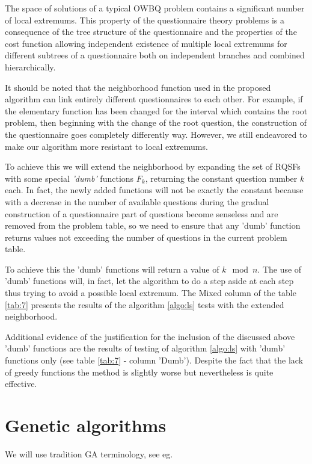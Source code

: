 \documentclass[11pt]{article}
\begin{document}
The space of solutions of a typical OWBQ problem contains a significant number of local extremums. This property of the questionnaire theory problems is a consequence of the tree structure of the questionnaire and the properties of the cost function allowing independent existence of multiple local extremums for different subtrees of a questionnaire both on independent branches and combined hierarchically.

It should be noted that the neighborhood function used in the proposed algorithm can link entirely different questionnaires to each other. For example, if the elementary function has been changed for the interval which contains the root problem, then beginning with the change of the root question, the construction of the questionnaire goes completely differently way. However, we still endeavored to make our algorithm more resistant to local extremums.

To achieve this we will extend the neighborhood by expanding the set of RQSFs with some special \textit{'dumb'} functions $F_k$, returning the constant question number $k$ each. In fact, the newly added functions will not be exactly the constant because with a decrease in the number of available questions during the gradual construction of a questionnaire part of questions become senseless and are removed from the problem table, so we need to ensure that any 'dumb' function returns values not exceeding the number of questions in the current problem table.

To achieve this the 'dumb' functions will return a value of $k\mod n$. The use of 'dumb' functions will, in fact, let the algorithm to do a step aside at each step thus trying to avoid a possible local extremum. The \textsf{Mixed} column of the table \ref{tab:7} presents the results of the algorithm \ref{algo:ls} tests with the extended neighborhood. 

Additional evidence of the justification for the inclusion of the discussed above 'dumb' functions are the results of testing of algorithm \ref{algo:ls} with 'dumb' functions only (see table \ref{tab:7} - column \textsf{'Dumb'}). Despite the fact that the lack of greedy functions the method is slightly worse but nevertheless is quite effective. 

%
%
%
%
%
%
%
\section{Genetic algorithms}
We will use tradition GA terminology, see eg. \cite{Ho, Be1, Be2}
\end{document}
